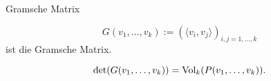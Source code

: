 \documentclass[class=article, crop=false]{standalone}
\begin{document}
\begin{zettel}{Gramsche Matrix}
\begin{flashcard}[]{}
	\begin{definition}
		\[
			G( v_1,\dots,v_k ):= \left(\langle v_i,v_j\rangle \right)_{i,j = 1,\dots,k}
		\] ist die Gramsche Matrix.
	\end{definition}
\end{flashcard}

\begin{theorem}
	\[
		\det(G ( v_1,\dots,v_k)) = \operatorname{Vol}_k(P(v_1,\dots,v_k))
	.\]
\end{theorem}
\end{zettel}
\end{document}
